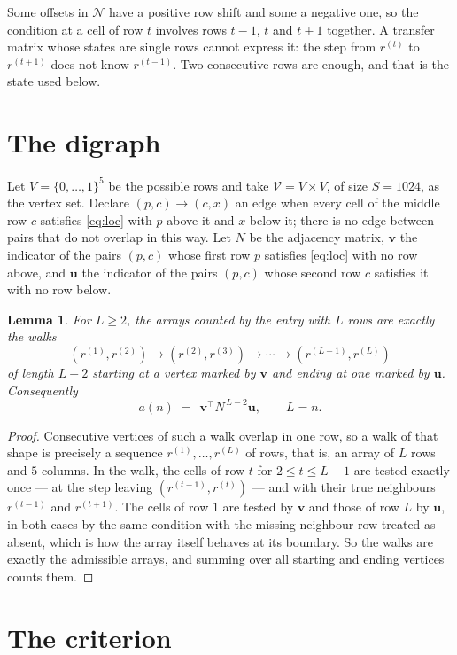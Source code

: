 \documentclass[11pt,a4paper]{article}
\theoremstyle{plain}
\newtheorem{lemma}[theorem]{Lemma}
\theoremstyle{definition}
\begin{document}
Some offsets in $\mathcal N$ have a positive row shift and some a negative one, so the
condition at a cell of row $t$ involves rows $t-1$, $t$ and $t+1$ together. A transfer
matrix whose states are single rows cannot express it: the step from $r^{(t)}$ to
$r^{(t+1)}$ does not know $r^{(t-1)}$. Two consecutive rows are enough, and that is
the state used below.

\section{The digraph}

Let $V=\{0,\dots,1\}^{5}$ be the possible rows and take
$\mathcal V=V\times V$, of size $S=1024$, as the vertex set. Declare $(p,c)\to(c,x)$ an edge
when every cell of the middle row $c$ satisfies \eqref{eq:loc} with $p$ above it and $x$
below it; there is no edge between pairs that do not overlap in this way. Let $N$ be the
adjacency matrix, $\mathbf{v}$ the indicator of the pairs $(p,c)$ whose first row $p$
satisfies \eqref{eq:loc} with no row above, and $\mathbf{u}$ the indicator of
the pairs $(p,c)$ whose second row $c$ satisfies it with no row below.

\begin{lemma}\label{lem:walk}
For $L\ge2$, the arrays counted by the entry with $L$ rows are exactly the walks
\[
(r^{(1)},r^{(2)})\to(r^{(2)},r^{(3)})\to\cdots\to(r^{(L-1)},r^{(L)})
\]
of length $L-2$ starting at a vertex marked by $\mathbf{v}$ and ending at one marked by
$\mathbf{u}$. Consequently
\[
a(n)\;=\;\,\mathbf{v}^{\!\top}N^{\,L-2}\mathbf{u},\qquad L=n .
\]
\end{lemma}

\begin{proof}
Consecutive vertices of such a walk overlap in one row, so a walk of that shape is
precisely a sequence $r^{(1)},\dots,r^{(L)}$ of rows, that is, an array of $L$ rows
and $5$ columns. In the walk, the cells of row $t$ for $2\le t\le L-1$ are tested
exactly once --- at the step leaving $(r^{(t-1)},r^{(t)})$ --- and with their true
neighbours $r^{(t-1)}$ and $r^{(t+1)}$. The cells of row $1$ are tested by
$\mathbf{v}$ and those of row $L$ by $\mathbf{u}$, in both cases by the same condition
with the missing neighbour row treated as absent, which is how the array itself behaves at
its boundary. So the walks are exactly the admissible arrays, and summing over all starting
and ending vertices counts them.
\end{proof}

\section{The criterion}
\end{document}
